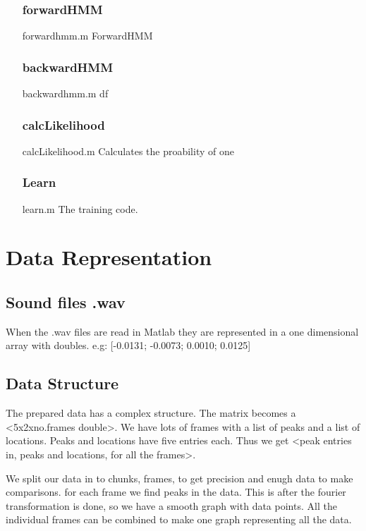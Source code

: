 \documentclass[titlepage]{article}
\begin{document}
\begin{itemize}
\subsubsection{forwardHMM}\item[forwardhmm.m] ForwardHMM 
\subsubsection{backwardHMM}\item[backwardhmm.m] df
\subsubsection{calcLikelihood}\item[calcLikelihood.m] Calculates the proability of one 
\subsubsection{Learn}\item[learn.m] The training code.   

\end{itemize}


\section{Data Representation}
    \subsection{Sound files .wav} 
When the .wav files are read in Matlab they are represented in a one dimensional array with doubles. e.g: [-0.0131; -0.0073; 0.0010; 0.0125]
    \subsection{Data Structure} %
The prepared data has a complex structure. The matrix becomes a <5x2xno.frames double>. We have lots of frames with a list of peaks and a list of locations. Peaks and locations have five entries each. Thus we get <peak entries in, peaks and locations, for all the frames>. 

We split our data in to chunks, frames, to get precision and enugh data to make comparisons. for each frame we find peaks in the data. This is after the fourier transformation is done, so we have a smooth graph with data points. All the individual frames can be combined to make one graph representing all the data. 
\end{document}
